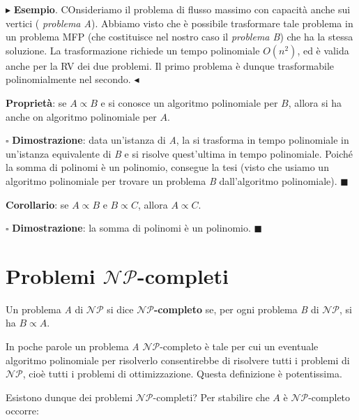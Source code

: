 \documentclass[11pt]{book}
\begin{document}
\vspace{11pt} $\blacktriangleright$ {\bf Esempio}. COnsideriamo il
problema di flusso massimo con capacit\`a anche sui vertici ({\em
  problema A}). Abbiamo visto che \`e possibile trasformare tale
problema in un problema MFP (che costituisce nel nostro caso il {\em
  problema B}) che ha la stessa soluzione. La trasformazione richiede
un tempo polinomiale $O(n^2)$, ed \`e valida anche per la RV dei due
problemi. Il primo problema \`e dunque trasformabile polinomialmente
nel secondo. $\blacktriangleleft$
\vspace{11pt}

{\bf Propriet\`a}: se $A \propto B$ e si conosce un algoritmo
polinomiale per $B$, allora si ha anche on algoritmo polinomiale per
$A$.

\vspace{11pt} $\square$ {\bf Dimostrazione}: data un'istanza di {\em
  A}, la si trasforma in tempo polinomiale in un'istanza equivalente
di {\em B} e si risolve quest'ultima in tempo polinomiale. Poich\'e la
somma di polinomi \`e un polinomio, consegue la tesi (visto che usiamo
un algoritmo polinomiale per trovare un problema {\em B}
dall'algoritmo polinomiale).  $\blacksquare$
\vspace{11pt}

{\bf Corollario}: se $A \propto B$ e $B \propto C$, allora $A \propto
C$.

\vspace{11pt} $\square$ {\bf Dimostrazione}: la somma di polinomi \`e
un polinomio.  $\blacksquare$
\vspace{11pt}

\section{Problemi $\mathcal{NP}$-completi}

Un problema {\em A} di $\mathcal{NP}$ si dice {\bf $\mathcal{NP}$-completo}
se, per ogni problema {\em B} di $\mathcal{NP}$, si ha $B \propto A$. 

In poche parole un problema {\em A} $\mathcal{NP}$-completo \`e tale
per cui un eventuale algoritmo polinomiale per risolverlo
consentirebbe di risolvere tutti i problemi di $\mathcal{NP}$, cio\`e
tutti i problemi di ottimizzazione. Questa definizione \`e
potentissima.

Esistono dunque dei problemi $\mathcal{NP}$-completi? Per stabilire
che $A$ \`e $\mathcal{NP}$-completo occorre:
\end{document}
